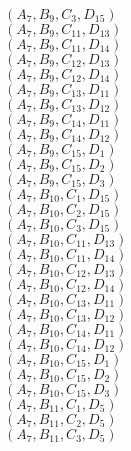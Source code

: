 \documentclass[14pt]{article}
\begin{document}
    $({A}_{7}, {B}_{9}, {C}_{3}, {D}_{15}) $ \\ 
    $({A}_{7}, {B}_{9}, {C}_{11}, {D}_{13}) $ \\ 
    $({A}_{7}, {B}_{9}, {C}_{11}, {D}_{14}) $ \\ 
    $({A}_{7}, {B}_{9}, {C}_{12}, {D}_{13}) $ \\ 
    $({A}_{7}, {B}_{9}, {C}_{12}, {D}_{14}) $ \\ 
    $({A}_{7}, {B}_{9}, {C}_{13}, {D}_{11}) $ \\ 
    $({A}_{7}, {B}_{9}, {C}_{13}, {D}_{12}) $ \\ 
    $({A}_{7}, {B}_{9}, {C}_{14}, {D}_{11}) $ \\ 
    $({A}_{7}, {B}_{9}, {C}_{14}, {D}_{12}) $ \\ 
    $({A}_{7}, {B}_{9}, {C}_{15}, {D}_{1}) $ \\ 
    $({A}_{7}, {B}_{9}, {C}_{15}, {D}_{2}) $ \\ 
    $({A}_{7}, {B}_{9}, {C}_{15}, {D}_{3}) $ \\ 
    $({A}_{7}, {B}_{10}, {C}_{1}, {D}_{15}) $ \\ 
    $({A}_{7}, {B}_{10}, {C}_{2}, {D}_{15}) $ \\ 
    $({A}_{7}, {B}_{10}, {C}_{3}, {D}_{15}) $ \\ 
    $({A}_{7}, {B}_{10}, {C}_{11}, {D}_{13}) $ \\ 
    $({A}_{7}, {B}_{10}, {C}_{11}, {D}_{14}) $ \\ 
    $({A}_{7}, {B}_{10}, {C}_{12}, {D}_{13}) $ \\ 
    $({A}_{7}, {B}_{10}, {C}_{12}, {D}_{14}) $ \\ 
    $({A}_{7}, {B}_{10}, {C}_{13}, {D}_{11}) $ \\ 
    $({A}_{7}, {B}_{10}, {C}_{13}, {D}_{12}) $ \\ 
    $({A}_{7}, {B}_{10}, {C}_{14}, {D}_{11}) $ \\ 
    $({A}_{7}, {B}_{10}, {C}_{14}, {D}_{12}) $ \\ 
    $({A}_{7}, {B}_{10}, {C}_{15}, {D}_{1}) $ \\ 
    $({A}_{7}, {B}_{10}, {C}_{15}, {D}_{2}) $ \\ 
    $({A}_{7}, {B}_{10}, {C}_{15}, {D}_{3}) $ \\ 
    $({A}_{7}, {B}_{11}, {C}_{1}, {D}_{5}) $ \\ 
    $({A}_{7}, {B}_{11}, {C}_{2}, {D}_{5}) $ \\ 
    $({A}_{7}, {B}_{11}, {C}_{3}, {D}_{5}) $ \\ 
\end{document}
